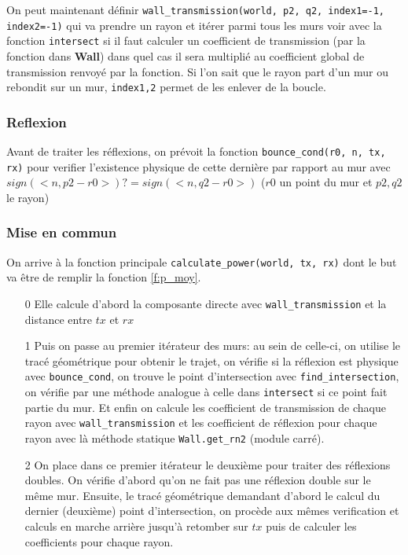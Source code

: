 \documentclass[sn-mathphys-num]{sn-jnl}%
\theoremstyle{thmstyleone}%
\theoremstyle{thmstyletwo}%
\theoremstyle{thmstylethree}%
\begin{document}
On peut maintenant définir \texttt{wall\_transmission(world, p2, q2, index1=-1, index2=-1)}
qui va prendre un rayon et itérer parmi tous les murs voir avec la fonction
\texttt{intersect} si il faut calculer un coefficient de transmission (par la fonction dans \textbf{Wall}) dans
quel cas il sera multiplié au coefficient global de transmission renvoyé par la fonction.
Si l'on sait que le rayon part d'un mur ou rebondit sur un mur, \texttt{index1,2} permet 
de les enlever de la boucle.

\subsubsection{Reflexion}
Avant de traiter les réflexions, on prévoit la fonction \texttt{bounce\_cond(r0, n, tx, rx)}
pour verifier l'existence physique de cette dernière par rapport au mur avec
$sign(<n,p2 - r0>) ?= sign(<n,q2 - r0>)$ ($r0$ un point du mur et $p2,q2$ le rayon)


\subsubsection{Mise en commun}
On arrive à la fonction principale \texttt{calculate\_power(world, tx, rx)} dont
le but va être de remplir la fonction \eqref{f:p_moy}.

\begin{enumerate}
    \item[0] Elle calcule d'abord la
composante directe avec \texttt{wall\_transmission} et la distance entre $tx$ et $rx$
    \item[1] Puis on passe au premier itérateur des murs: au sein de celle-ci,
on utilise le tracé géométrique pour obtenir le trajet, on vérifie si la réflexion
est physique avec \texttt{bounce\_cond}, on trouve le point d'intersection avec
\texttt{find\_intersection},
on vérifie par une méthode analogue à celle dans \texttt{intersect} si ce point fait partie du mur.
Et enfin on calcule les coefficient de transmission de chaque rayon avec \texttt{wall\_transmission}
et les coefficient de réflexion pour chaque rayon avec là méthode statique \texttt{Wall.get\_rn2} (module carré).
    \item[2] On place dans ce premier itérateur le deuxième pour traiter des réflexions doubles.
On vérifie d'abord qu'on ne fait pas une réflexion double sur le même mur.
Ensuite, le tracé géométrique demandant d'abord le calcul du dernier (deuxième) point d'intersection,
on procède aux mêmes verification et calculs en marche arrière jusqu'à retomber sur $tx$
puis de calculer les coefficients pour chaque rayon.
\end{enumerate}
\end{document}
